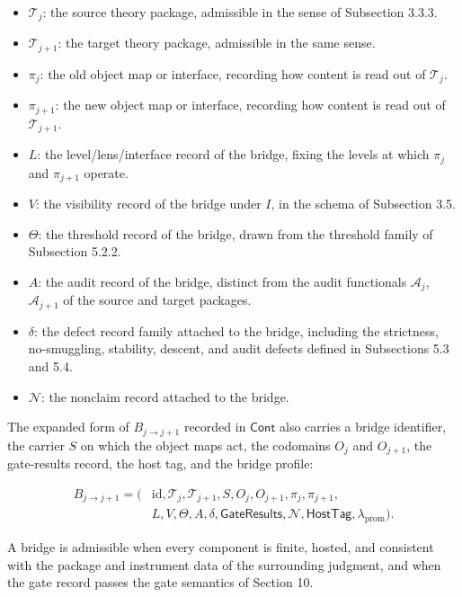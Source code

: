 \documentclass[11pt]{article}
\providecommand{\tightlist}{}
\theoremstyle{definition}
\begin{document}
\begin{itemize}
\tightlist
\item
  \(\mathcal T_j\): the source theory package, admissible in the sense of Subsection 3.3.3.
\item
  \(\mathcal T_{j+1}\): the target theory package, admissible in the same sense.
\item
  \(\pi_j\): the old object map or interface, recording how content is read out of \(\mathcal T_j\).
\item
  \(\pi_{j+1}\): the new object map or interface, recording how content is read out of \(\mathcal T_{j+1}\).
\item
  \(L\): the level/lens/interface record of the bridge, fixing the levels at which \(\pi_j\) and \(\pi_{j+1}\) operate.
\item
  \(V\): the visibility record of the bridge under \(I\), in the schema of Subsection 3.5.
\item
  \(\Theta\): the threshold record of the bridge, drawn from the threshold family of Subsection 5.2.2.
\item
  \(A\): the audit record of the bridge, distinct from the audit functionals \(\mathcal A_j\), \(\mathcal A_{j+1}\) of the source and target packages.
\item
  \(\delta\): the defect record family attached to the bridge, including the strictness, no-smuggling, stability, descent, and audit defects defined in Subsections 5.3 and 5.4.
\item
  \(\mathcal N\): the nonclaim record attached to the bridge.
\end{itemize}

The expanded form of \(B_{j\to j+1}\) recorded in \(\mathsf{Cont}\) also carries a bridge identifier, the carrier \(S\) on which the object maps act, the codomains \(O_j\) and \(O_{j+1}\), the gate-results record, the host tag, and the bridge profile:

\[
\begin{aligned}
B_{j\to j+1}=\bigl(&\mathrm{id},\mathcal T_j,\mathcal T_{j+1},S,O_j,O_{j+1},\pi_j,\pi_{j+1},\\
&L,V,\Theta,A,\delta,\mathsf{GateResults},\mathcal N,\mathsf{HostTag},\lambda_{\mathrm{prom}}\bigr).
\end{aligned}
\]

A bridge is admissible when every component is finite, hosted, and consistent with the package and instrument data of the surrounding judgment, and when the gate record passes the gate semantics of Section 10.
\end{document}
